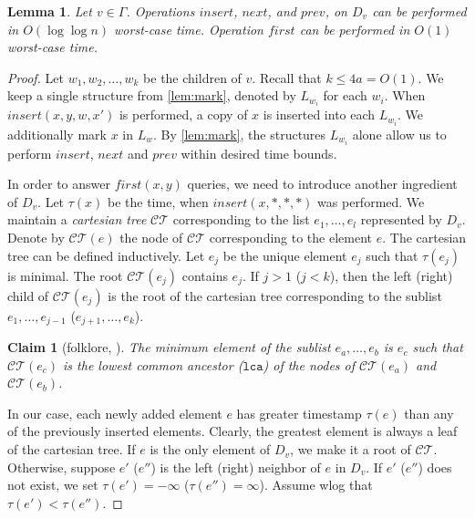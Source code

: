 \documentclass[a4paper]{article}
\newtheorem{lemma}[theorem]{Lemma}
\newtheorem{claim}[theorem]{Claim}
\theoremstyle{remark}
\begin{document}
\begin{lemma}
Let $v\in\Gamma$.
Operations $insert$, $next$, and $prev$, on $D_v$ can be performed in $O(\log{\log{n}})$
worst-case time. Operation $first$ can be performed in $O(1)$ worst-case time.
\end{lemma}
\begin{proof}
Let $w_1,w_2,\ldots,w_k$ be the children of $v$.
Recall that $k\leq 4a=O(1)$.
We keep a single structure from \cref{lem:mark}, denoted by $L_{w_i}$
for each $w_i$.
When $insert(x,y,w,x')$ is performed,
a copy of $x$ is inserted into each $L_{w_i}$.
We additionally mark $x$ in $L_w$.
By \cref{lem:mark}, the structures $L_{w_i}$ alone allow us to perform
$insert$, $next$ and $prev$ within desired time bounds.


\newcommand{\tmlca}{\mathtt{lca}}

In order to answer $first(x,y)$ queries, we need to introduce
another ingredient of $D_v$.
Let $\tau(x)$ be the time, when $insert(x,*,*,*)$ was performed.
We maintain a \emph{cartesian tree} $\mathcal{CT}$ corresponding to the list
$e_1,\ldots,e_l$ represented by $D_v$.
Denote by $\mathcal{CT}(e)$ the node of $\mathcal{CT}$ corresponding
to the element $e$.
The cartesian tree can be defined inductively.
Let $e_j$ be the unique element $e_j$ such that $\tau(e_j)$ is minimal.
The root $\mathcal{CT}(e_j)$ contains $e_j$.
If $j>1$ ($j<k$), then the left (right) child of $\mathcal{CT}(e_j)$ is the root of
the cartesian tree corresponding
to the sublist $e_1,\ldots,e_{j-1}$ ($e_{j+1},\ldots,e_k$).
\begin{claim}[folklore, \cite{LCA}]\label{cla:cartesian}
The minimum element of the sublist $e_a,\ldots,e_b$ is $e_c$ such
that $\mathcal{CT}(e_c)$
is the lowest common ancestor ($\tmlca$) of the nodes of $\mathcal{CT}(e_a)$
and $\mathcal{CT}(e_b)$.
\end{claim}


In our case, each newly added element $e$ has greater timestamp $\tau(e)$
than any of the previously inserted elements.
Clearly, the greatest element is always a leaf of the cartesian tree.
If $e$ is the only element of $D_v$, we make it a root of $\mathcal{CT}$.
Otherwise, suppose $e'$ ($e''$) is the left (right) neighbor of $e$ in $D_v$.
If $e'$ ($e''$) does not exist, we set $\tau(e')=-\infty$ ($\tau(e'')=\infty$).
Assume wlog that $\tau(e')<\tau(e'')$.


\end{proof}
\end{document}
